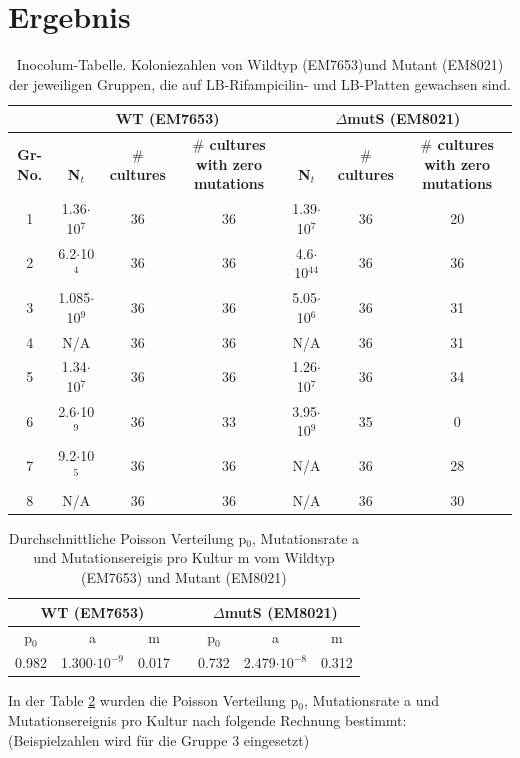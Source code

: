 \documentclass[oneside,10pt,a4paper]{report}
\begin{document}
		\section{Ergebnis}
		\begin{table}[H]
			\centering
			\caption{Inocolum-Tabelle. Koloniezahlen von Wildtyp (EM7653)und Mutant (EM8021) der jeweiligen Gruppen, die auf LB-Rifampicilin- und LB-Platten gewachsen sind.}
			\label{tab: exp4-Ergebnis}
			\begin{tabular}{ccccccc}
				\toprule
				&\multicolumn{3}{c}{WT (EM7653)}&\multicolumn{3}{c}{$\Delta$mutS (EM8021)}\\
				\midrule
				\multirow{3}{*}{\parbox[t]{1cm}{\textbf{Gr-No.}}}&\multirow{3}{*}{\parbox[t]{2cm}{\textbf{$\qquad$N$_t$}}}& \multirow{3}{*}{\parbox[t]{2cm}{\textbf{$\#$ cultures}}}& \multirow{3}{*}{\parbox[t]{2cm}{\textbf{$\#$ cultures with zero mutations}}} &\multirow{3}{*}{\parbox[t]{2cm}{\textbf{$\qquad$N$_t$}}}& \multirow{3}{*}{\parbox[t]{2cm}{\textbf{$\#$ cultures}}}& \multirow{3}{*}{\parbox[t]{2cm}{\textbf{$\#$ cultures with zero mutations}}}\\
				&&&&&&\\
				&&&&&&\\
				\midrule
				1&1.36$\cdot$10$^7$&36&36&1.39$\cdot$10$^7$&36&20\\
				2&6.2$\cdot$10$^4$&36&36&4.6$\cdot$10$^44$&36&36\\
				3&1.085$\cdot$10$^9$&36&36&5.05$\cdot$10$^6$&36&31\\
				4&N/A&36&36&N/A&36&31\\
				5&1.34$\cdot$10$^7$&36&36&1.26$\cdot$10$^7$&36&34\\
				6&2.6$\cdot$10$^9$&36&33&3.95$\cdot$10$^9$&35&0\\
				7&9.2$\cdot$10$^5$&36&36&N/A&36&28\\
				8&N/A&36&36&N/A&36&30\\
				\bottomrule			
			\end{tabular}
		\end{table}
		
		\begin{table}[H]
			\centering
			\caption{Durchschnittliche Poisson Verteilung p$_0$, Mutationsrate a und Mutationsereigis pro Kultur m vom Wildtyp (EM7653) und Mutant (EM8021)}
			\label{tab: exp4-mutationrate}
			\begin{tabular}{ccccccc}
				\toprule
				\multicolumn{3}{c}{WT (EM7653)}&&\multicolumn{3}{c}{$\Delta$mutS (EM8021)}\\
				\midrule
				p$_0$&a&m&&	p$_0$&a&m\\
				\midrule
				0.982& 1.300$\cdot 10^{-9}$&0.017&&0.732 & 2.479$\cdot 10^{-8}$&0.312\\
				\bottomrule			
			\end{tabular}
		\end{table}
		In der Table \ref{tab: exp4-mutationrate} wurden die Poisson Verteilung p$_0$, Mutationsrate a und Mutationsereignis pro Kultur nach folgende Rechnung bestimmt:\\
		(Beispielzahlen wird für die Gruppe 3 eingesetzt)
		
\end{document}
